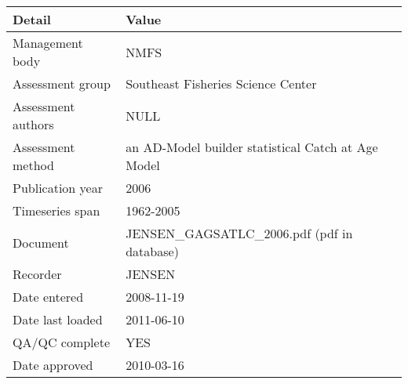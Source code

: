 \begin{table}[htb]
\centering
\begin{tabular}{lp{7cm}}
\toprule
Detail & Value \\
\midrule
Management body    & NMFS                                               \\
Assessment group   & Southeast Fisheries Science Center                 \\
Assessment authors & NULL                                               \\
Assessment method  & an AD-Model builder statistical Catch at Age Model \\
Publication year   & 2006                                               \\
Timeseries span    & 1962-2005                                          \\
Document           & JENSEN\_GAGSATLC\_2006.pdf (pdf in database)       \\
Recorder           & JENSEN                                             \\
Date entered       & 2008-11-19                                         \\
Date last loaded   & 2011-06-10                                         \\
QA/QC complete     & YES                                                \\
Date approved      & 2010-03-16                                         \\
\bottomrule
\end{tabular}
\label{tab:assessdet}
\end{table}
